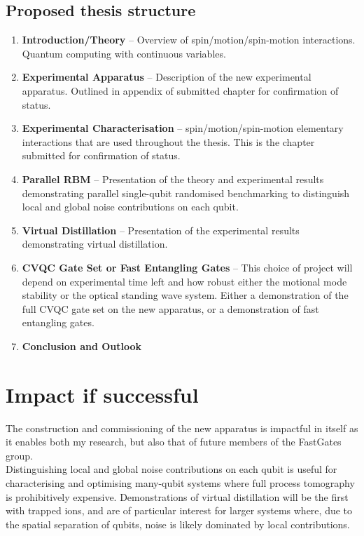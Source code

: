 \documentclass[12pt]{article}
\begin{document}
\subsection*{Proposed thesis structure}
\begin{enumerate}
    \item \textbf{Introduction/Theory} -- Overview of spin/motion/spin-motion interactions. Quantum computing with continuous variables. 
    \item \textbf{Experimental Apparatus} -- Description of the new experimental apparatus. Outlined in appendix of submitted chapter for confirmation of status.
    \item \textbf{Experimental Characterisation} -- spin/motion/spin-motion elementary interactions that are used throughout the thesis. This is the chapter submitted for confirmation of status.
    \item \textbf{Parallel RBM} -- Presentation of the theory and experimental results demonstrating parallel single-qubit randomised benchmarking to distinguish local and global noise contributions on each qubit.
    \item \textbf{Virtual Distillation} -- Presentation of the experimental results demonstrating virtual distillation.
    \item \textbf{CVQC Gate Set or Fast Entangling Gates} -- This choice of project will depend on experimental time left and how robust either the motional mode stability or the optical standing wave system. Either a demonstration of the full CVQC gate set on the new apparatus, or a demonstration of fast entangling gates.
    \item \textbf{Conclusion and Outlook} 
\end{enumerate}


\section{Impact if successful}
\noindent The construction and commissioning of the new apparatus is impactful in itself as it enables both my research, but also that of future members of the FastGates group.\\

\noindent Distinguishing local and global noise contributions on each qubit is useful for characterising and optimising many-qubit systems where full process tomography is prohibitively expensive. Demonstrations of virtual distillation will be the first with trapped ions, and are of particular interest for larger systems where, due to the spatial separation of qubits, noise is likely dominated by local contributions.\\
\end{document}
